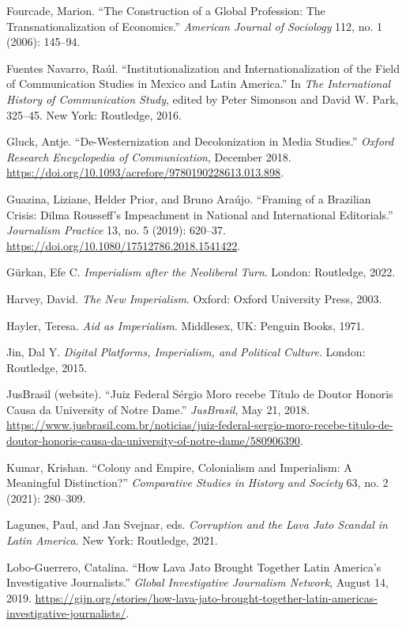 \documentclass{tufte-handout}
\begin{document}
\begin{hangparas}{.25in}{1}
Fourcade, Marion. ``The Construction of a Global Profession: The
Transnationalization of Economics.'' \emph{American Journal of
Sociology} 112, no. 1 (2006): 145--94.

Fuentes Navarro, Raúl. ``Institutionalization and Internationalization
of the Field of Communication Studies in Mexico and Latin America.'' In
\emph{The International History of Communication Study}, edited by Peter
Simonson and David W. Park, 325--45. New York: Routledge, 2016.

Gluck, Antje. ``De-Westernization and Decolonization in Media Studies.''
\emph{Oxford Research Encyclopedia of Communication}, December 2018.
\url{https://doi.org/10.1093/acrefore/9780190228613.013.898}.

Guazina, Liziane, Helder Prior, and Bruno Araújo. ``Framing of a
Brazilian Crisis: Dilma Rousseff's Impeachment in National and
International Editorials.'' \emph{Journalism Practice} 13, no. 5 (2019):
620--37. \url{https://doi.org/10.1080/17512786.2018.1541422}.

Gürkan, Efe C. \emph{Imperialism after the Neoliberal Turn}. London:
Routledge, 2022.

Harvey, David. \emph{The New Imperialism}. Oxford: Oxford University
Press, 2003.

Hayler, Teresa. \emph{Aid as Imperialism}. Middlesex, UK: Penguin Books,
1971.

Jin, Dal Y. \emph{Digital Platforms, Imperialism, and Political
Culture}. London: Routledge, 2015.

JusBrasil (website). ``Juiz Federal Sérgio Moro recebe Título de Doutor
Honoris Causa da University of Notre Dame.'' \emph{JusBrasil}, May 21,
2018.
\href{https://www.jusbrasil.com.br/noticias/juiz-federal-sergio-moro-recebe-titulo-de-doutor-honoris-causa-da-university-of-notre-dame/580906390}{https://www.jusbrasil.com.br/noticias/juiz-federal-sergio-moro-recebe-titulo-de-doutor-honoris-causa-da-university-of-notre-dame/580906390}.

Kumar, Krishan. ``Colony and Empire, Colonialism and Imperialism: A
Meaningful Distinction?'' \emph{Comparative Studies in History and
Society} 63, no. 2 (2021): 280--309.

Lagunes, Paul, and Jan Svejnar, eds. \emph{Corruption and the Lava Jato
Scandal in Latin America}. New York: Routledge, 2021.

Lobo-Guerrero, Catalina. ``How Lava Jato Brought Together Latin
America's Investigative Journalists.'' \emph{Global Investigative
Journalism Network}, August 14, 2019.
\href{https://gijn.org/stories/how-lava-jato-brought-together-latin-americas-investigative-journalists/}{https://gijn.org/stories/how-lava-jato-brought-together-latin-americas-investigative-journalists/}.


\end{hangparas}
\end{document}
